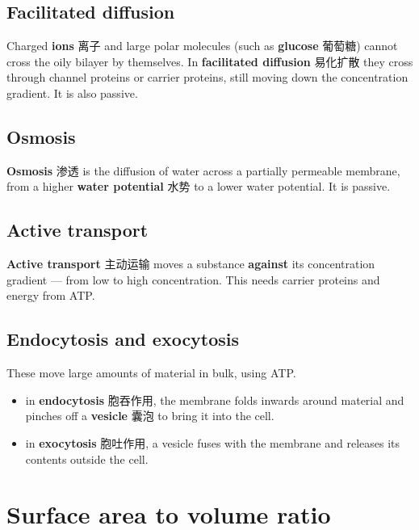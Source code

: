 \documentclass[11pt]{article}
\begin{document}
\subsection*{Facilitated diffusion}

Charged \textbf{ions} 离子 and large polar molecules (such as \textbf{glucose} 葡萄糖) cannot cross the oily bilayer by themselves. In \textbf{facilitated diffusion} 易化扩散 they cross through channel proteins or carrier proteins, still moving down the concentration gradient. It is also passive.

\subsection*{Osmosis}

\textbf{Osmosis} 渗透 is the diffusion of water across a partially permeable membrane, from a higher \textbf{water potential} 水势 to a lower water potential. It is passive.

\subsection*{Active transport}

\textbf{Active transport} 主动运输 moves a substance \textbf{against} its concentration gradient — from low to high concentration. This needs carrier proteins and energy from ATP.

\subsection*{Endocytosis and exocytosis}

These move large amounts of material in bulk, using ATP.

\begin{itemize}
\item in \textbf{endocytosis} 胞吞作用, the membrane folds inwards around material and pinches off a \textbf{vesicle} 囊泡 to bring it into the cell.

\item in \textbf{exocytosis} 胞吐作用, a vesicle fuses with the membrane and releases its contents outside the cell.

\end{itemize}

\section*{Surface area to volume ratio}
\end{document}
